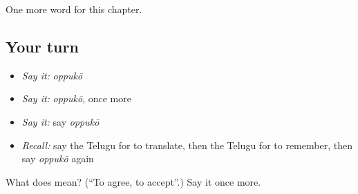 \begin{grammarlens}[title={What you've built}]
One more word for this chapter.
\end{grammarlens}

\subsection*{Your turn}
\begin{itemize}
\raggedright
  \item \emph{Say it:} \emph{oppukō}
  \item \emph{Say it:} \emph{oppukō}, once more
  \item \emph{Say it:} say \emph{oppukō}
  \item \emph{Recall:} say the Telugu for to translate, then the Telugu for to remember, then say \emph{oppukō} again
\end{itemize}

\begin{tcolorbox}[breakable,colback=teal!4,colframe=teal!35!black,title={Before you move on}]
What does  mean? (\textquotedblleft{}To agree, to accept\textquotedblright{}.) Say it once more.
\end{tcolorbox}
